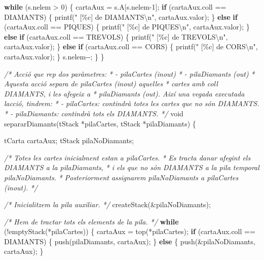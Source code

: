 \documentclass[
]{book}
\newenvironment{Shaded}{\begin{snugshade}}{\end{snugshade}}
\newcommand{\CommentTok}[1]{\textcolor[rgb]{0.56,0.35,0.01}{\textit{#1}}}
\newcommand{\ControlFlowTok}[1]{\textcolor[rgb]{0.13,0.29,0.53}{\textbf{#1}}}
\newcommand{\DataTypeTok}[1]{\textcolor[rgb]{0.13,0.29,0.53}{#1}}
\newcommand{\DecValTok}[1]{\textcolor[rgb]{0.00,0.00,0.81}{#1}}
\newcommand{\NormalTok}[1]{#1}
\newcommand{\SpecialCharTok}[1]{\textcolor[rgb]{0.00,0.00,0.00}{#1}}
\newcommand{\StringTok}[1]{\textcolor[rgb]{0.31,0.60,0.02}{#1}}
\begin{document}
\begin{Shaded}
\begin{Highlighting}[]
    \ControlFlowTok{while}\NormalTok{ (s.nelem \textgreater{} }\DecValTok{0}\NormalTok{) \{}
\NormalTok{        cartaAux = s.A[s.nelem{-}}\DecValTok{1}\NormalTok{]; }
        \ControlFlowTok{if}\NormalTok{ (cartaAux.coll == DIAMANTS) \{}
\NormalTok{            printf(}\StringTok{"  [\%c] de DIAMANTS}\SpecialCharTok{\textbackslash{}n}\StringTok{"}\NormalTok{, cartaAux.valor);}
\NormalTok{        \} }\ControlFlowTok{else} \ControlFlowTok{if}\NormalTok{ (cartaAux.coll == PIQUES) \{}
\NormalTok{            printf(}\StringTok{"  [\%c] de PIQUES}\SpecialCharTok{\textbackslash{}n}\StringTok{"}\NormalTok{, cartaAux.valor);}
\NormalTok{        \} }\ControlFlowTok{else} \ControlFlowTok{if}\NormalTok{ (cartaAux.coll == TREVOLS) \{}
\NormalTok{            printf(}\StringTok{"  [\%c] de TREVOLS}\SpecialCharTok{\textbackslash{}n}\StringTok{"}\NormalTok{, cartaAux.valor);}
\NormalTok{        \} }\ControlFlowTok{else} \ControlFlowTok{if}\NormalTok{ (cartaAux.coll == CORS) \{}
\NormalTok{            printf(}\StringTok{"  [\%c] de CORS}\SpecialCharTok{\textbackslash{}n}\StringTok{"}\NormalTok{, cartaAux.valor);}
\NormalTok{        \}}
\NormalTok{        s.nelem{-}{-};}
\NormalTok{    \}}
\NormalTok{\}}

\CommentTok{/* Acció que rep dos paràmetres:}
\CommentTok{ * {-} pilaCartes (inout)}
\CommentTok{ * {-} pilaDiamants (out)}
\CommentTok{ * Aquesta acció separa de pilaCartes (inout) aquelles}
\CommentTok{ * cartes amb coll DIAMANTS, i les afegeix a}
\CommentTok{ * pilaDiamants (out). Així una vegada executada l\textquotesingle{}acció, tindrem:}
\CommentTok{ * {-} pilaCartes: contindrà totes les cartes que no són DIAMANTS.}
\CommentTok{ * {-} pilaDiamants: contindrà tots els DIAMANTS. }
\CommentTok{ */}
\DataTypeTok{void}\NormalTok{ separarDiamants(tStack *pilaCartes, tStack *pilaDiamants) \{}
    
\NormalTok{    tCarta cartaAux;}
\NormalTok{    tStack pilaNoDiamants;}
    
    \CommentTok{/* Totes les cartes inicialment estan a pilaCartes.}
\CommentTok{     * Es tracta d\textquotesingle{}anar afegint els DIAMANTS a la pilaDiamants,}
\CommentTok{     * i els que no són DIAMANTS a la pila temporal pilaNoDiamants.}
\CommentTok{     * Posteriorment assignarem pilaNoDiamants a pilaCartes (inout).}
\CommentTok{     */}
    
    \CommentTok{/* Inicialitzem la pila auxiliar. */}
\NormalTok{    createStack(\&pilaNoDiamants);}
    
    \CommentTok{/* Hem de tractar tots els elements de la pila. */}
    \ControlFlowTok{while}\NormalTok{ (!emptyStack(*pilaCartes)) \{}
\NormalTok{        cartaAux = top(*pilaCartes);}
        \ControlFlowTok{if}\NormalTok{ (cartaAux.coll == DIAMANTS) \{}
\NormalTok{            push(pilaDiamants, cartaAux);}
\NormalTok{        \} }\ControlFlowTok{else}\NormalTok{ \{}
\NormalTok{            push(\&pilaNoDiamants, cartaAux);            }
\NormalTok{        \}}
        

\end{Highlighting}
\end{Shaded}
\end{document}

